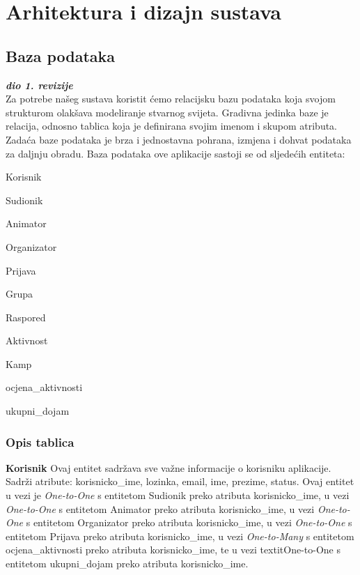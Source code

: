 \chapter{Arhitektura i dizajn sustava}
	
		\section{Baza podataka}
			
			\textbf{\textit{dio 1. revizije}}\\
			
		Za potrebe našeg sustava koristit ćemo relacijsku bazu podataka koja svojom strukturom olakšava modeliranje stvarnog svijeta. Gradivna jedinka baze je relacija, odnosno tablica koja je definirana svojim imenom i skupom atributa. Zadaća baze podataka je brza i jednostavna pohrana, izmjena i dohvat podataka za daljnju obradu. Baza podataka ove aplikacije sastoji se od sljedećih entiteta:
		\begin{packed_item}
			\item Korisnik
			\item Sudionik
			\item Animator
			\item Organizator
			\item Prijava
			\item Grupa
			\item Raspored
			\item Aktivnost
			\item Kamp
			\item ocjena\_aktivnosti
			\item ukupni\_dojam
		\end{packed_item}
			\subsection{Opis tablica}
			

				\textbf{Korisnik}	Ovaj entitet sadržava sve važne informacije o korisniku aplikacije. Sadrži atribute: korisnicko\_ime, lozinka, email, ime, prezime, status. Ovaj entitet u vezi je \textit{One-to-One} s entitetom Sudionik preko atributa korisnicko\_ime, u vezi \textit{One-to-One} s entitetom Animator preko atributa korisnicko\_ime, u vezi \textit{One-to-One} s entitetom Organizator preko atributa korisnicko\_ime, u vezi \textit{One-to-One} s entitetom Prijava preko atributa korisnicko\_ime, u vezi \textit{One-to-Many} s entitetom ocjena\_aktivnosti preko atributa korisnicko\_ime, te u vezi textit{One-to-One} s entitetom ukupni\_dojam preko atributa korisnicko\_ime.
				
